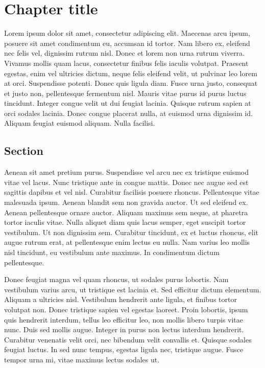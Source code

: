 
\chapter{Chapter title}

Lorem ipsum dolor sit amet, consectetur adipiscing elit. Maecenas arcu ipsum, posuere sit amet condimentum eu, accumsan id tortor. Nam libero ex, eleifend nec felis vel, dignissim rutrum nisl. Donec et lorem non urna rutrum viverra. Vivamus mollis quam lacus, consectetur finibus felis iaculis volutpat. Praesent egestas, enim vel ultricies dictum, neque felis eleifend velit, ut pulvinar leo lorem at orci. Suspendisse potenti. Donec quis ligula diam. Fusce urna justo, consequat et justo non, pellentesque fermentum nisl. Mauris vitae purus id purus luctus tincidunt. Integer congue velit ut dui feugiat lacinia. Quisque rutrum sapien at orci sodales lacinia. Donec congue placerat nulla, at euismod urna dignissim id. Aliquam feugiat euismod aliquam. Nulla facilisi.

\section{Section}
Aenean sit amet pretium purus. Suspendisse vel arcu nec ex tristique euismod vitae vel lacus. Nunc tristique ante in congue mattis. Donec nec augue sed est sagittis dapibus et vel nisl. Curabitur facilisis posuere rhoncus. Pellentesque vitae malesuada ipsum. Aenean blandit sem non gravida auctor. Ut sed eleifend ex. Aenean pellentesque ornare auctor. Aliquam maximus sem neque, at pharetra tortor iaculis vitae. Nulla aliquet diam quis lacus semper, eget suscipit tortor vestibulum. Ut non dignissim sem. Curabitur tincidunt, ex et luctus rhoncus, elit augue rutrum erat, at pellentesque enim lectus eu nulla. Nam varius leo mollis nisl tincidunt, eu vestibulum ante maximus. In condimentum dictum pellentesque.

Donec feugiat magna vel quam rhoncus, ut sodales purus lobortis. Nam vestibulum varius arcu, ut tristique est lacinia et. Sed efficitur dictum elementum. Aliquam a ultricies nisl. Vestibulum hendrerit ante ligula, et finibus tortor volutpat non. Donec tristique sapien vel egestas laoreet. Proin lobortis, ipsum quis hendrerit interdum, tellus leo efficitur leo, non mollis libero turpis vitae nunc. Duis sed mollis augue. Integer in purus non lectus interdum hendrerit. Curabitur venenatis velit orci, nec bibendum velit convallis et. Quisque sodales feugiat luctus. In sed nunc tempus, egestas ligula nec, tristique augue. Fusce tempor urna mi, vitae maximus lectus sodales ut.
